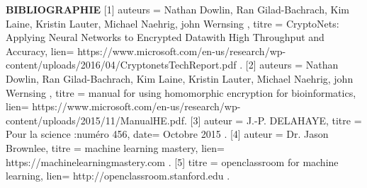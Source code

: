 \documentclass[a4paper,12pt]{report}
\begin{document}
\newpage
\textbf{BIBLIOGRAPHIE}\newline
\newline 
\scriptsize
[1]{
auteurs = {Nathan Dowlin, Ran Gilad-Bachrach, Kim Laine, Kristin Lauter, Michael Naehrig, john Wernsing  },
titre = {CryptoNets: Applying Neural Networks to Encrypted Datawith High Throughput and Accuracy},
lien= {https://www.microsoft.com/en-us/research/wp-content/uploads/2016/04/CryptonetsTechReport.pdf .}}
\newline
\newline
{[2]{
auteurs = {Nathan Dowlin, Ran Gilad-Bachrach, Kim Laine, Kristin Lauter, Michael Naehrig, john Wernsing  },
titre = {manual for using homomorphic encryption for bioinformatics},
lien= {https://www.microsoft.com/en-us/research/wp-content/uploads/2015/11/ManualHE.pdf.}}}
\newline
\newline
{[3]{
auteur = {J.-P. DELAHAYE},
titre = {Pour la science :numéro 456},
date= {Octobre 2015 .}}}
\newline
\newline
{[4]{
auteur = {Dr. Jason Brownlee},
titre = {machine learning mastery},
lien= {https://machinelearningmastery.com .}}}
\newline
\newline
{[5]{
titre = {openclassroom for machine learning},
lien= {http://openclassroom.stanford.edu .}}}
\newline
{}
\newline
\newline
\end{document}
